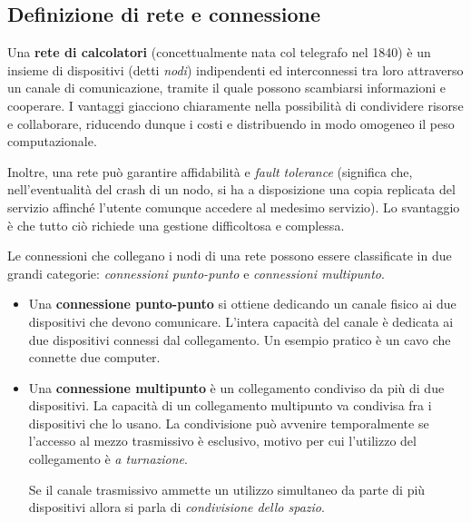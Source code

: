     \subsection{Definizione di rete e connessione}
    
        Una \textbf{rete di calcolatori} (concettualmente nata col telegrafo nel 1840) è un insieme di dispositivi (detti \textit{nodi}) indipendenti ed interconnessi tra loro attraverso un canale di comunicazione, tramite il quale possono scambiarsi informazioni e cooperare. I vantaggi giacciono chiaramente nella possibilità di condividere risorse e collaborare, riducendo dunque i costi e distribuendo in modo omogeneo il peso computazionale. 
        
        Inoltre, una rete può garantire affidabilità e \textit{fault tolerance} (significa che, nell'eventualità del crash di un nodo, si ha a disposizione una copia replicata del servizio affinché l'utente comunque accedere al medesimo servizio). Lo svantaggio è che tutto ciò richiede una gestione difficoltosa e complessa.
        
        \vspace{3mm}
        
        Le connessioni che collegano i nodi di una rete possono essere classificate in due
        grandi categorie: \textit{connessioni punto-punto} e \textit{connessioni multipunto}.
        
        \begin{itemize}
            \item 
            Una \textbf{connessione punto-punto} si ottiene dedicando un canale fisico ai due dispositivi che devono comunicare. L’intera capacità del canale è dedicata ai due dispositivi connessi dal
            collegamento. Un esempio pratico è un cavo che connette due computer.
            
            \item
            Una \textbf{connessione multipunto} è un collegamento condiviso da più di due dispositivi. La capacità di un collegamento multipunto va condivisa fra i dispositivi che lo usano. La condivisione può avvenire temporalmente se l’accesso al mezzo trasmissivo è esclusivo, motivo per cui l'utilizzo del collegamento è \textit{a turnazione}. 
            
            Se il canale trasmissivo ammette un utilizzo simultaneo da parte di più dispositivi allora si parla di \textit{condivisione dello spazio}.
        \end{itemize}
        
